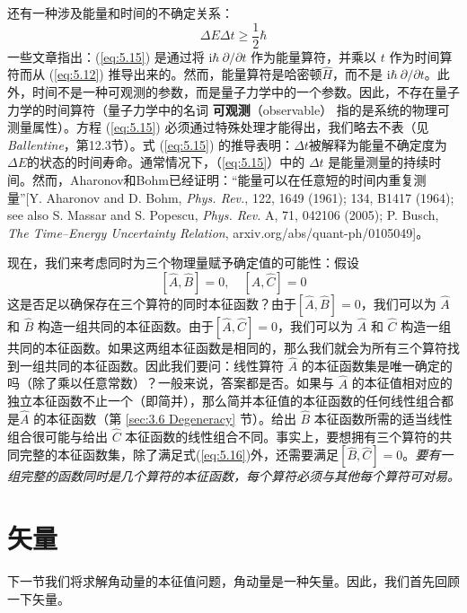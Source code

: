     还有一种涉及能量和时间的不确定关系：
    \begin{equation}
        \Delta E \Delta t \ge \frac{1}{2}\hbar
        \label{eq:5.15}
    \end{equation}
    一些文章指出：(\ref{eq:5.15}) 是通过将 $\mathrm{i}\hbar \: \partial /\partial t$ 作为能量算符，并乘以 $t$ 作为时间算符而从 (\ref{eq:5.12}) 推导出来的。然而，能量算符是哈密顿$\hat{H}$，而不是 $\mathrm{i}\hbar \: \partial /\partial t$。此外，时间不是一种可观测的参数，而是量子力学中的一个参数。因此，不存在量子力学的时间算符（量子力学中的名词 \textbf{可观测}（observable） 指的是系统的物理可测量属性）。方程 (\ref{eq:5.15}) 必须通过特殊处理才能得出，我们略去不表（见 \textit{Ballentine}，第12.3节）。式 (\ref{eq:5.15}) 的推导表明：$\Delta t$被解释为能量不确定度为$\Delta E$的状态的时间寿命。通常情况下，（\ref{eq:5.15}）中的 $\Delta t$ 是能量测量的持续时间。然而，Aharonov和Bohm已经证明：“能量可以在任意短的时间内重复测量”[Y. Aharonov and D. Bohm, \textit{Phys. Rev.}, 122, 1649 (1961); 134, B1417 (1964); see also S. Massar and S. Popescu, \textit{Phys. Rev.} A, 71, 042106 (2005); P. Busch, \textit{The Time–Energy Uncertainty Relation}, arxiv.org/abs/quant-ph/0105049]。

    现在，我们来考虑同时为三个物理量赋予确定值的可能性：假设
    \begin{equation}
        \left[\hat{A},\hat{B}\right] = 0, \quad \left[\hat{A},\hat{C}\right] = 0
        \label{eq:5.16}
    \end{equation}
    这是否足以确保存在三个算符的同时本征函数？由于$\left[\hat{A},\hat{B}\right] = 0$，我们可以为 $\hat{A}$ 和 $\hat{B}$ 构造一组共同的本征函数。由于$\left[\hat{A},\hat{C}\right] = 0$，我们可以为 $\hat{A}$ 和 $\hat{C}$ 构造一组共同的本征函数。如果这两组本征函数是相同的，那么我们就会为所有三个算符找到一组共同的本征函数。因此我们要问：线性算符 $\hat{A}$ 的本征函数集是唯一确定的吗（除了乘以任意常数）？一般来说，答案都是否。如果与 $\hat{A}$ 的本征值相对应的独立本征函数不止一个（即简并），那么简并本征值的本征函数的任何线性组合都是$\hat{A}$ 的本征函数（第 \ref{sec:3.6 Degeneracy} 节）。给出 $\hat{B}$ 本征函数所需的适当线性组合很可能与给出 $\hat{C}$ 本征函数的线性组合不同。事实上，要想拥有三个算符的共同完整的本征函数集，除了满足式(\ref{eq:5.16})外，还需要满足$\left[\hat{B},\hat{C}\right] = 0$。\textit{要有一组完整的函数同时是几个算符的本征函数，每个算符必须与其他每个算符可对易。}

\section{矢量}
\label{sec:5.2 Vectors}
    下一节我们将求解角动量的本征值问题，角动量是一种矢量。因此，我们首先回顾一下矢量。

